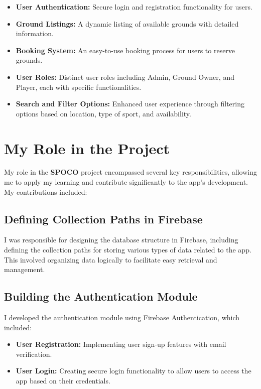 \documentclass[12pt,a4paper]{report}
\begin{document}
\begin{itemize}
    \item \textbf{User Authentication:} Secure login and registration functionality for users.
    \item \textbf{Ground Listings:} A dynamic listing of available grounds with detailed information.
    \item \textbf{Booking System:} An easy-to-use booking process for users to reserve grounds.
    \item \textbf{User Roles:}  Distinct user roles including Admin, Ground Owner, and Player, each with specific functionalities.
   \item 
   \textbf{Search and Filter Options:} Enhanced user experience through filtering options based on location, type of sport, and availability.
\end{itemize}

\section{My Role in the Project}
My role in the \textbf{SPOCO} project encompassed several key responsibilities, allowing me to apply my learning and contribute significantly to the app's development. My contributions included:

\subsection{Defining Collection Paths in Firebase}
I was responsible for designing the database structure in Firebase, including defining the collection paths for storing various types of data related to the app. This involved organizing data logically to facilitate easy retrieval and management.

\subsection{Building the Authentication Module}
I developed the authentication module using Firebase Authentication, which included:
\begin{itemize}
    \item \textbf{User Registration:} Implementing user sign-up features with email verification.
    \item \textbf{User Login:} Creating secure login functionality to allow users to access the app based on their credentials.
\end{itemize}
\end{document}
